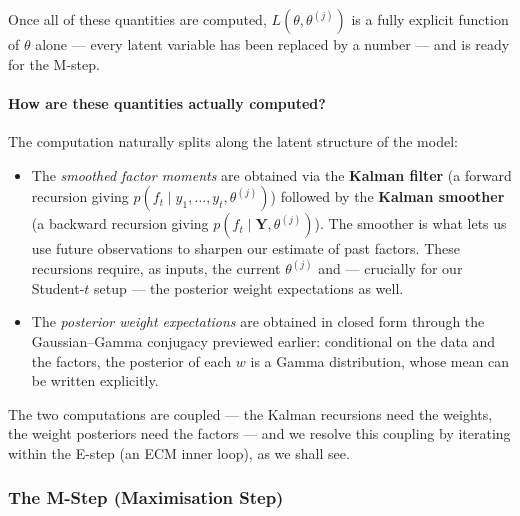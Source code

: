 \documentclass[11pt, a4paper, oneside]{article}
\newcommand{\mY}{\mathbf{Y}}
\begin{document}
Once all of these quantities are computed, $L(\theta, \theta^{(j)})$ is a
fully explicit function of $\theta$ alone — every latent variable has
been replaced by a number — and is ready for the M-step.

\paragraph{How are these quantities actually computed?}
The computation naturally splits along the latent structure of the
model:
\begin{itemize}[leftmargin=1.5em, itemsep=3pt]
    \item The \emph{smoothed factor moments} are obtained via the
          \textbf{Kalman filter} (a forward recursion giving
          $p(f_t \mid y_1, \ldots, y_t, \theta^{(j)})$) followed by the
          \textbf{Kalman smoother} (a backward recursion giving
          $p(f_t \mid \mY, \theta^{(j)})$). The smoother is what lets us
          use future observations to sharpen our estimate of past
          factors. These recursions require, as inputs, the current
          $\theta^{(j)}$ and — crucially for our Student-$t$ setup — the
          posterior weight expectations as well.
    \item The \emph{posterior weight expectations} are obtained in
          closed form through the Gaussian–Gamma conjugacy previewed
          earlier: conditional on the data and the factors, the
          posterior of each $w$ is a Gamma distribution, whose mean can
          be written explicitly.
\end{itemize}

The two computations are coupled — the Kalman recursions need the
weights, the weight posteriors need the factors — and we resolve this
coupling by iterating within the E-step (an ECM inner loop), as
we shall see. 

\subsubsection{The M-Step (Maximisation Step)}
\label{subsec:m-step-preview}
\end{document}
